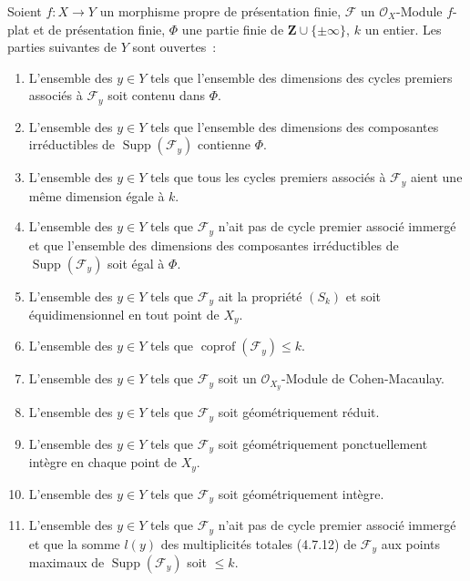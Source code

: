 \begin{theorem}[12.2.1]
\label{IV.12.2.1-fr}
Soient $f:X\to Y$ un morphisme propre de présentation finie,
$\mathcal F$ un $\mathcal O_X$-Module $f$-plat et de présentation finie,
$\Phi$ une partie finie de $\mathbf Z\cup\{\pm\infty\}$, $k$ un entier. Les
parties suivantes de $Y$ sont ouvertes~:
\begin{enumerate}[label=\textup{(\roman*)}]
  \item L'ensemble des $y\in Y$ tels que l'ensemble des dimensions des cycles
  premiers associés à $\mathcal F_y$ soit contenu dans $\Phi$.
  \item L'ensemble des $y\in Y$ tels que l'ensemble des dimensions des
  composantes irréductibles de $\operatorname{Supp}(\mathcal F_y)$ contienne
  $\Phi$.
  \item L'ensemble des $y\in Y$ tels que tous les cycles premiers associés à
  $\mathcal F_y$ aient une même dimension égale à $k$.
  \item L'ensemble des $y\in Y$ tels que $\mathcal F_y$ n'ait pas de cycle
  premier associé immergé et que l'ensemble des dimensions des composantes
  irréductibles de $\operatorname{Supp}(\mathcal F_y)$ soit égal à $\Phi$.
  \item L'ensemble des $y\in Y$ tels que $\mathcal F_y$ ait la propriété
  $(S_k)$ et soit équidimensionnel en tout point de $X_y$.
  \item L'ensemble des $y\in Y$ tels que
  $\operatorname{coprof}(\mathcal F_y)\leq k$.
  \item L'ensemble des $y\in Y$ tels que $\mathcal F_y$ soit un
  $\mathcal O_{X_y}$-Module de Cohen-Macaulay.
  \item L'ensemble des $y\in Y$ tels que $\mathcal F_y$ soit géométriquement
  réduit.
  \item L'ensemble des $y\in Y$ tels que $\mathcal F_y$ soit géométriquement
  ponctuellement intègre en chaque point de $X_y$.
  \item L'ensemble des $y\in Y$ tels que $\mathcal F_y$ soit géométriquement
  intègre.
  \item L'ensemble des $y\in Y$ tels que $\mathcal F_y$ n'ait pas de cycle
  premier associé immergé et que la somme $l(y)$ des multiplicités totales
  \textup{(4.7.12)} de $\mathcal F_y$ aux points maximaux de
  $\operatorname{Supp}(\mathcal F_y)$ soit $\leq k$.
\end{enumerate}
\end{theorem}

